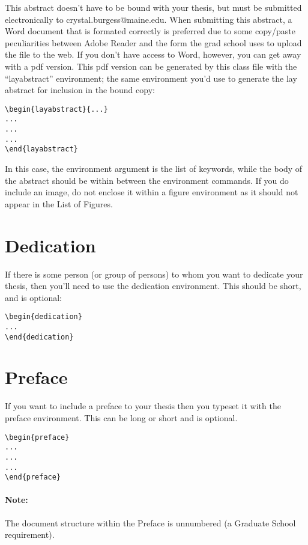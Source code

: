 This abstract doesn't have to be bound with your thesis, but must be submitted electronically to crystal.burgess@maine.edu.  When submitting this abstract, a Word document that is formated correctly is preferred due to some copy/paste peculiarities between Adobe Reader and the form the grad school uses to upload the file to the web.  If you don't have access to Word, however, you can get away with a pdf version.  This pdf version can be generated by this class file with the ``layabstract'' environment; the same environment you'd use to generate the lay abstract for inclusion in the bound copy:

\begin{verbatim}
\begin{layabstract}{...}
...
...
...
\end{layabstract}
\end{verbatim}

In this case, the environment argument is the list of keywords, while the body of the abstract should be within between the environment commands.  If you do include an image, do not enclose it within a figure environment as it should not appear in the List of Figures.

\section{Dedication}
If there is some person (or group of persons) to whom you want to dedicate your thesis, then you'll need to use the dedication environment.  This should be short, and is optional:
\begin{verbatim}
\begin{dedication}
...
\end{dedication}
\end{verbatim}

\section{Preface}
If you want to include a preface to your thesis then you typeset it with the preface environment.  This can be long or short and is optional.

\begin{verbatim}
\begin{preface}
...
...
...
\end{preface}
\end{verbatim}

\paragraph{Note:}The document structure within the Preface is unnumbered (a Graduate School requirement).


